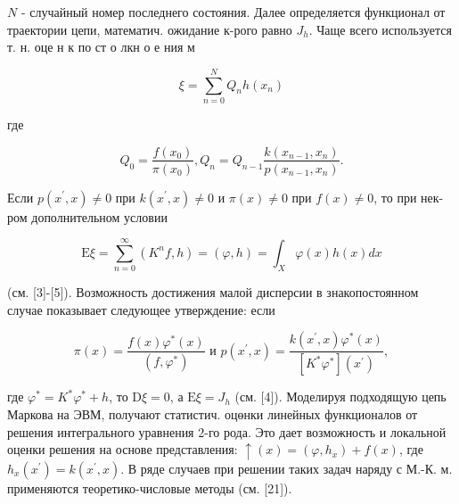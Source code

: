 \documentclass[10pt]{article}
\begin{document}
$N$ - случайный номер последнего состояния. Далее определяется функционал от траектории цепи, математич. ожидание к-рого равно $J_{h}$. Чаще всего используется т. н. оце н к по ст о лкн о е ния м



\[

\xi=\sum_{n=0}^{N} Q_{n} h\left(x_{n}\right)

\]



где



\[

Q_{0}=\frac{f\left(x_{0}\right)}{\pi\left(x_{0}\right)}, Q_{n}=Q_{n-1} \frac{k\left(x_{n-1}, x_{n}\right)}{p\left(x_{n-1}, x_{n}\right)} .

\]



Если $p\left(x^{\prime}, x\right) \neq 0$ при $k\left(x^{\prime}, x\right) \neq 0$ и $\pi(x) \neq 0$ при $f(x) \neq 0$, то при нек-ром дополнительном условии



\[

\mathrm{E} \xi=\sum_{n=0}^{\infty}\left(K^{n} f, h\right)=(\varphi, h)=\int_{X} \varphi(x) h(x) d x

\]



(см. [3]-[5]). Возможность достижения малой дисперсии в знакопостоянном случае показывает следующее утверждение: если



\[

\pi(x)=\frac{f(x) \varphi^{*}(x)}{\left(f, \varphi^{*}\right)} \text { и } p\left(x^{\prime}, x\right)=\frac{k\left(x^{\prime}, x\right) \varphi^{*}(x)}{\left[K^{*} \varphi^{*}\right]\left(x^{\prime}\right)},

\]



где $\varphi^{*}=K^{*} \varphi^{*}+h$, то $\mathrm{D} \xi=0$, а $\mathrm{E} \xi=J_{h}$ (см. [4]). Моделируя подходящую цепь Маркова на ЭВМ, получают статистич. оцөнки линейных функционалов от решения интегрального уравнения 2-го рода. Это дает возможность и локальной оценки решения на основе представления: $\uparrow(x)=\left(\varphi, h_{x}\right)+f(x)$, где $h_{x}\left(x^{\prime}\right)=k\left(x^{\prime}, x\right)$. В ряде случаев при решении таких задач наряду с М.-К. м. применяются теоретико-числовые методы (см. [21]).
\end{document}
